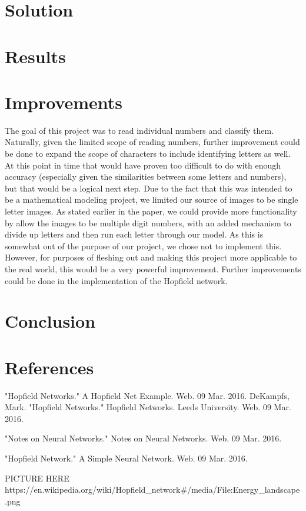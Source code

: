 \documentclass[]{article}
\begin{document}
\section{Solution}

\section{Results}

\section{Improvements}
The goal of this project was to read individual numbers and classify them.  Naturally, given the limited scope of reading numbers, further improvement could be done to expand the scope of characters to include identifying letters as well.  At this point in time that would have proven too difficult to do with enough accuracy (especially given the similarities between some letters and numbers), but that would be a logical next step.  Due to the fact that this was intended to be a mathematical modeling project, we limited our source of images to be single letter images.  As stated earlier in the paper, we could provide more functionality by allow the images to be multiple digit numbers, with an added mechanism to divide up letters and then run each letter through our model.  As this is somewhat out of the purpose of our project, we chose not to implement this.  However, for purposes of fleshing out and making this project more applicable to the real world, this would be a very powerful improvement.
Further improvements could be done in the implementation of the Hopfield network.  

\section{Conclusion}

\section{References}
"Hopfield Networks." A Hopfield Net Example. Web. 09 Mar. 2016. 
DeKampfs, Mark. "Hopfield Networks." Hopfield Networks. Leeds University. Web. 09 Mar. 2016.

"Notes on Neural Networks." Notes on Neural Networks. Web. 09 Mar. 2016.

"Hopfield Network." A Simple Neural Network. Web. 09 Mar. 2016.


 PICTURE HERE
https://en.wikipedia.org/wiki/Hopfield_network#/media/File:Energy_landscape.png
\end{document}
